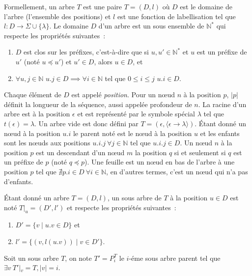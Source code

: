 \begin{definition}[Arbre]
    Formellement, un arbre $T$ est une paire $T = (D, l)$ où $D$ est le domaine de l'arbre (l'ensemble des positions) et $l$ est une fonction de labellisation
    tel que $l : D \to \Sigma \cup \{\lambda\}$.
    Le domaine $D$ d'un arbre est un sous ensemble de $\mathbb{N}^*$ qui respecte les propriétés suivantes :
    \begin{enumerate}
        \item $D$ est clos sur les préfixes, c'est-à-dire que si $u, u' \in \mathbb{N}^*$ et $u$ est un préfixe de $u'$ (noté $u \preceq u'$) et $u' \in D$, alors $u \in D$, et
        \item $\forall u, j \in \mathbb{N}$ $u.j \in D \implies \forall i \in \mathbb{N}$ tel que $0 \leq i \leq j$ $ u.i \in D$.
    \end{enumerate}
    Chaque élément de $D$ est appelé \emph{position}.
    Pour un nœud $n$ à la position $p$, $|p|$ définit la longueur de la séquence, aussi appelée profondeur de $n$.
    La racine d'un arbre est à la position $\epsilon$ et est représenté par le symbole spécial $\lambda$ tel que $t(\epsilon) = \lambda$.
    Un arbre vide est donc défini par  $T = (\epsilon, \langle \epsilon \to \lambda \rangle)$.
    Étant donné un nœud à la position $u.i$ le parent noté est le nœud à la position $u$ et les enfants sont les nœuds aux positions $u.i.j ~ \forall j \in \mathbb{N}$ tel que $u.i.j \in D$.
    Un nœud $n$ à la position $p$ est un descendant d'un nœud $m$ la position $q$ si et seulement si $q$ est un préfixe de $p$ (noté $q \preceq p$).
    Une feuille est un nœud en bas de l'arbre à une position $p$ tel que $\nexists p.i \in D ~ \forall i \in \mathbb{N}$, en d'autres termes, c'est un nœud qui n'a pas d'enfants.
\end{definition}

\begin{definition}
    Étant donné un arbre $T = (D, l)$, un sous arbre de $T$ à la position $u \in D$ est noté $T|_u = (D', l')$ et respecte les propriétés suivantes :
    \begin{enumerate}
        \item $D' = \{v \mid u.v \in D\}$ et
        \item $l' = \{(v, l(u.v)) \mid v \in D'\}$.
    \end{enumerate}
    Soit un sous arbre $T$, on note $T' = P_i^T$ le $i$-éme sous arbre parent tel que $\exists v ~ T'|_v = T, |v| = i$.
\end{definition}

